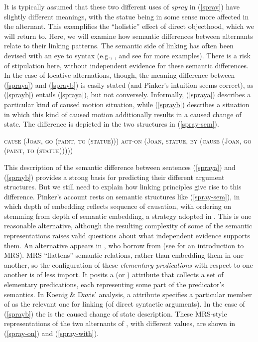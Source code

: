 \documentclass[output=paper
                ,modfonts
                ,nonflat
	        ,collection
	        ,collectionchapter
	        ,collectiontoclongg
 	        ,biblatex
                ,babelshorthands
                ,newtxmath
                ,draftmode
                ,colorlinks, citecolor=brown
]{./langsci/langscibook}
\begin{document}
It is typically assumed that these two different uses of \textit{spray} in (\ref{spray}) have slightly different meanings, with the statue being in some sense more affected in the  alternant.
This exemplifies the ``holistic'' effect of direct objecthood,  which we will return to.
Here, we will examine how semantic differences between alternants relate to their linking patterns.
The semantic side of linking has often been devised with an eye to syntax (e.g., \citet{Pinker1989}, and see \citet{KoenigandDavis2006} for more examples).
There is a risk of stipulation here, without independent evidence for these semantic differences.
In the case of locative alternations, though, the meaning difference between (\ref{spraya}) and (\ref{sprayb}) is easily stated (and Pinker's intuition seems correct), as (\ref{sprayb}) entails (\ref{spraya}), but not conversely.
Informally, (\ref{spraya}) describes a particular kind of caused motion situation, while  (\ref{sprayb}) describes a situation in which this kind of caused motion additionally results in a caused change of state.
The difference is depicted in the two structures in (\ref{spray-sem}).

\begin{exe}\ex\label{spray-sem}
\begin{xlist}
\ex \label{spray-sema} \textsc{cause (Joan, go (paint, to (statue)))}
\ex \label{spray-semb} \textsc{act-on (Joan, statue, by (cause (Joan, go (paint, to (statue)))))}
\end{xlist}
\end{exe}

This description of the semantic difference between sentences (\ref{spraya}) and (\ref{sprayb}) provides a strong basis for predicting their different argument structures.
But we still need to explain how linking principles give rise to this difference.
Pinker's account rests on semantic structures like (\ref{spray-sem}), in which depth of embedding reflects sequence of causation, with ordering on \argst stemming from depth of semantic embedding, a strategy adopted in \citet{Davis1996,Davis2001}.
This is one reasonable alternative, although the resulting complexity of some of the semantic representations raises valid questions about what independent evidence supports them.
An alternative appears in \citet{KoenigandDavis2006}, who borrow from  (see  for an introduction to MRS).
MRS ``flattens'' semantic relations, rather than embedding them in one another, so the configuration of these \emph{elementary predications}  with respect to one another is of less import.
It posits a  (or \rels)  attribute that collects a set of elementary predications, each representing some part of the predicator's semantics.
In Koenig \& Davis' analysis, a  attribute specifies a particular member of \rels as the relevant one for linking (of direct syntactic arguments). 
In the case of (\ref{sprayb}) the  is the caused change of state description.
These MRS-style representations of the two alternants of , with different  values, are shown in (\ref{spray-on}) and (\ref{spray-with}).
\end{document}
